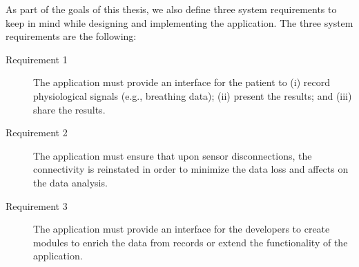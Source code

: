 As part of the goals of this thesis, we also define three system requirements to keep in mind while designing and implementing the application. The three system requirements are the following: 

\begin{description}
    \item[Requirement 1] The application must provide an interface for the patient to (i) record physiological signals (e.g., breathing data); (ii) present the results; and (iii) share the results.
    \item[Requirement 2] The application must ensure that upon sensor disconnections, the connectivity is reinstated in order to minimize the data loss and affects on the data analysis.
    \item[Requirement 3] The application must provide an interface for the developers to create modules to enrich the data from records or extend the functionality of the application.
\end{description}


